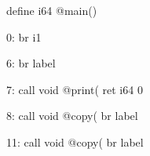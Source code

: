 define i64 @main() {
0:
	br i1 %

6:
	br label %

7:
	call void @print(%
	ret i64 0

8:
	call void @copy(%
	br label %

11:
	call void @copy(%
	br label %
}